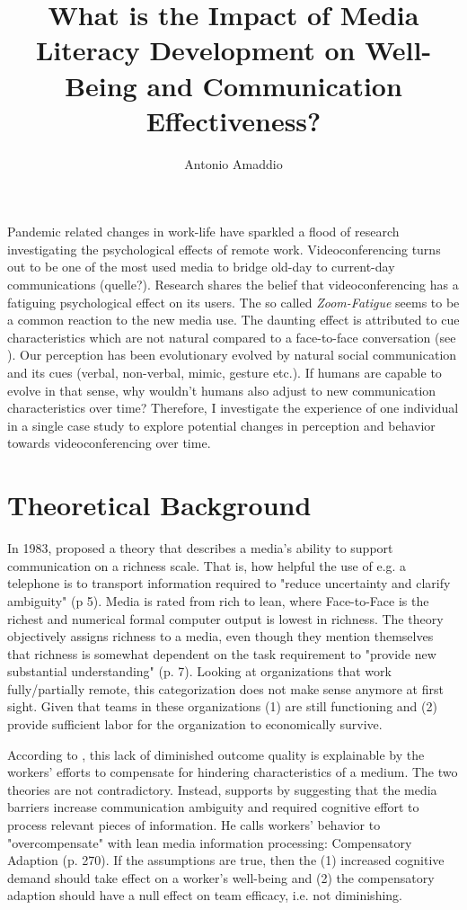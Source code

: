 \documentclass[man]{apa7}
\title{What is the Impact of Media Literacy Development on Well-Being and Communication Effectiveness?}
\author{Antonio Amaddio}
\affiliation{Freie Universität Berlin \\ A\&O Vertiefung, Winter 2022/23, Supervisor: Dr. Lisa Handke}
\begin{document}
\maketitle
Pandemic related changes in work-life have sparkled a flood of research investigating the psychological effects of remote work. Videoconferencing turns out to be one of the most used media to bridge old-day to current-day communications (quelle?). Research shares the belief that videoconferencing has a fatiguing psychological effect on its users. The so called \textit{Zoom-Fatigue} seems to be a common reaction to the new media use. The daunting effect is attributed to cue characteristics which are not natural compared to a face-to-face conversation (see \cite{Riedl2021}). Our perception has been evolutionary evolved by natural social communication and its cues (verbal, non-verbal, mimic, gesture etc.). If humans are capable to evolve in that sense, why wouldn't humans also adjust to new communication characteristics over time? Therefore, I investigate the experience of one individual in a single case study to explore potential changes in perception and behavior towards videoconferencing over time.

\section{Theoretical Background}

In 1983, \citeauthor{daft1983information} proposed a theory that describes a media's ability to support communication on a richness scale. That is, how helpful the use of e.g. a telephone is to transport information required to "reduce uncertainty and clarify ambiguity" (p 5). Media is rated from rich to lean, where Face-to-Face is the richest and numerical formal computer output is lowest in richness. The theory objectively assigns richness to a media, even though they mention themselves that richness is somewhat dependent on the task requirement to "provide new substantial understanding" (p. 7). Looking at organizations that work fully/partially remote, this categorization does not make sense anymore at first sight. Given that teams in these organizations (1) are still functioning and (2) provide sufficient labor for the organization to economically survive.

According to \citeauthor{Kock2005}, this lack of diminished outcome quality is explainable by the workers' efforts to compensate for hindering characteristics of a medium. The two theories are not contradictory. Instead, \citeauthor{Kock2005} supports by suggesting that the media barriers increase communication ambiguity and required cognitive effort to process relevant pieces of information. He calls workers' behavior to "overcompensate" with lean media information processing: Compensatory Adaption (p. 270). If the assumptions are true, then the (1) increased cognitive demand should take effect on a worker's well-being and (2) the compensatory adaption should have a null effect on team efficacy, i.e. not diminishing.
\end{document}
